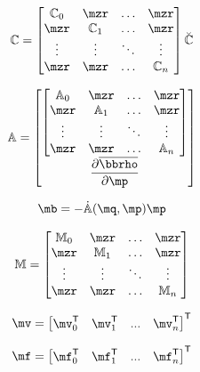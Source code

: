 \documentclass[a4paper,11pt,brazil,fleqn]{article}
\begin{document}
\begin{equation} \label{eq:MatrizC2}
\mC = 
\begin{bmatrix}
\mC_0 &  \mzr  & \ldots & \mzr\\
\mzr  &  \mC_1 & \ldots & \mzr\\
\vdots & \vdots & \ddots & \vdots\\
\mzr  &   \mzr       &\ldots & \mC_{n}
\end{bmatrix}
\breve{\mC}
\end{equation}

\begin{equation} \label{eq:MatrizA2}
\mA = 
\begin{bmatrix}
\begin{bmatrix}
\mA_0  & \mzr & \ldots & \mzr\\
\mzr & \mA_1 & \ldots & \mzr\\
\vdots & \vdots & \ddots & \vdots\\
\mzr  & \mzr     &\ldots & \mA_{n}
\end{bmatrix} \\
\displaystyle\frac{\partial \overline{\mrho}}{\partial \mp}
\end{bmatrix}
\end{equation}

\begin{equation} \label{eq:Matrizb2}
\mb = - \dot{\mA}(\mq,\mp) \mp
\end{equation}

\begin{equation} \label{eq:MatrizM2}
\mM =
\begin{bmatrix}
\mM_0 &  \mzr  & \ldots & \mzr\\
\mzr  &  \mM_1 & \ldots & \mzr\\
\vdots & \vdots & \ddots & \vdots\\
\mzr  &   \mzr       &\ldots & \mM_{n}
\end{bmatrix}
\end{equation}

\begin{equation} \label{eq:Matrizv2}
\mv = \begin{bmatrix}
\mv_0^\msT & \mv_1^\msT & ... & \mv_{n}^\msT
\end{bmatrix}^\msT
\end{equation}

\begin{equation} \label{eq:Matrizf2}
\mf = \begin{bmatrix}
\mf_0^\msT & \mf_1^\msT & ... & \mf_{n}^\msT
\end{bmatrix}^\msT
\end{equation}
\end{document}
